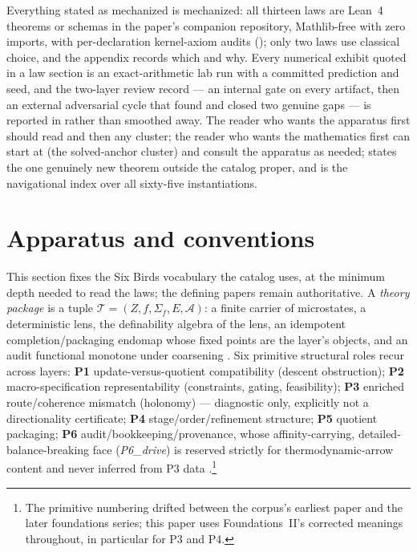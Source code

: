 \documentclass[11pt]{article}
\theoremstyle{definition}
\begin{document}
Everything stated as mechanized is mechanized: all thirteen laws are Lean~4 theorems or schemas in
the paper's companion repository, Mathlib-free with zero imports, with per-declaration kernel-axiom
audits (); only two laws use classical choice, and the appendix records
which and why. Every numerical exhibit quoted in a law section is an exact-arithmetic lab run with a
committed prediction and seed, and the two-layer review record --- an internal gate on every
artifact, then an external adversarial cycle that found and closed two genuine gaps --- is reported
in  rather than smoothed away. The reader who wants the apparatus
first should read  and then any cluster; the reader who wants
the mathematics first can start at  (the solved-anchor cluster) and consult the
apparatus as needed;  states the one genuinely new theorem outside the
catalog proper, and  is the navigational index over all sixty-five
instantiations.

\section{Apparatus and conventions}\label{sec:apparatus}

This section fixes the Six Birds vocabulary the catalog uses, at the minimum depth needed to read the
laws; the defining papers remain authoritative. A \emph{theory package} is a tuple
$\mathcal{T} = (Z, f, \Sigma_f, E, \mathcal{A})$: a finite carrier of microstates, a deterministic
lens, the definability algebra of the lens, an idempotent completion/packaging endomap whose fixed
points are the layer's objects, and an audit functional monotone under coarsening
\citep{Tsiokos2026EmergenceCalculus}. Six primitive structural roles recur across layers: \textbf{P1}
update-versus-quotient compatibility (descent obstruction); \textbf{P2} macro-specification
representability (constraints, gating, feasibility); \textbf{P3} enriched route/coherence mismatch
(holonomy) --- diagnostic only, explicitly not a directionality certificate; \textbf{P4}
stage/order/refinement structure; \textbf{P5} quotient packaging; \textbf{P6}
audit/bookkeeping/provenance, whose affinity-carrying, detailed-balance-breaking face
(\emph{P6\_drive}) is reserved strictly for thermodynamic-arrow content and never inferred from P3
data \citep{Tsiokos2026FoundII}.\footnote{The primitive numbering drifted between the corpus's
earliest paper and the later foundations series; this paper uses Foundations~II's corrected meanings
throughout, in particular for P3 and P4.}
\end{document}
